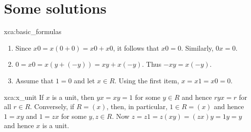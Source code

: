 


\section*{Some solutions}

\fancyhf{}
\fancyfoot[R]{\thepage}
\fancyhead[L]{\course}
\setlength{\headheight}{14pt}

\begin{sol}{xca:basic_formulas}\
\begin{enumerate}
    \item Since $x0=x(0+0)=x0+x0$, it follows that $x0=0$. Similarly, $0x=0$. 
    \item $0=x0=x(y+(-y))=xy+x(-y)$. Thus $-xy=x(-y)$.
    \item Assume that $1=0$ and let $x\in R$. Using the first item, 
        $x=x1=x0=0$.  
\end{enumerate}
\end{sol}

        

\begin{sol}{xca:x_unit}
If $x$ is a unit, then $yx=xy=1$ for some $y\in R$ and hence $ryx=r$ for all $r\in R$. Conversely, 
if $R=(x)$, then, in particular, $1\in R=(x)$ and hence $1=xy$ and $1=zx$ for some $y,z\in R$. Now
$z=z1=z(xy)=(zx)y=1y=y$ and hence $x$ is a unit. 
\end{sol}

